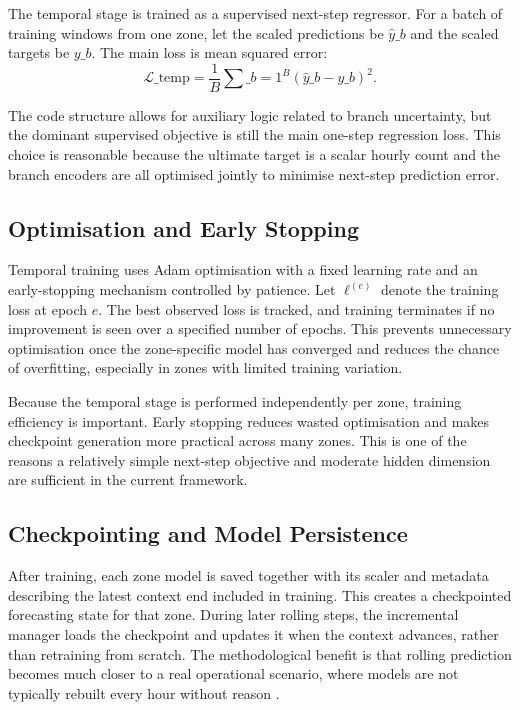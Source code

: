 \documentclass[12pt,a4paper]{report}
\begin{document}
The temporal stage is trained as a supervised next-step regressor. For a batch of training windows from one zone, let the scaled predictions be \(\hat{y}\_b\) and the scaled targets be \(y\_b\). The main loss is mean squared error:
\[
\mathcal{L}\_{\text{temp}}
=
\frac{1}{B}\sum\_{b=1}^{B}
(\hat{y}\_b - y\_b)^2.
\]

The code structure allows for auxiliary logic related to branch uncertainty, but the dominant supervised objective is still the main one-step regression loss. This choice is reasonable because the ultimate target is a scalar hourly count and the branch encoders are all optimised jointly to minimise next-step prediction error.

\subsection{Optimisation and Early Stopping}

Temporal training uses Adam optimisation with a fixed learning rate and an early-stopping mechanism controlled by patience. Let \(\ell^{(e)}\) denote the training loss at epoch \(e\). The best observed loss is tracked, and training terminates if no improvement is seen over a specified number of epochs. This prevents unnecessary optimisation once the zone-specific model has converged and reduces the chance of overfitting, especially in zones with limited training variation.

Because the temporal stage is performed independently per zone, training efficiency is important. Early stopping reduces wasted optimisation and makes checkpoint generation more practical across many zones. This is one of the reasons a relatively simple next-step objective and moderate hidden dimension are sufficient in the current framework.

\subsection{Checkpointing and Model Persistence}

After training, each zone model is saved together with its scaler and metadata describing the latest context end included in training. This creates a checkpointed forecasting state for that zone. During later rolling steps, the incremental manager loads the checkpoint and updates it when the context advances, rather than retraining from scratch. The methodological benefit is that rolling prediction becomes much closer to a real operational scenario, where models are not typically rebuilt every hour without reason \cite{hewamalage2022pitfalls,cavalcante2024review}.
\end{document}
